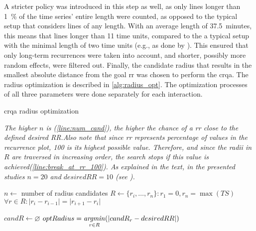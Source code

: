 A stricter policy was introduced in this step as well, as only lines longer than \SI{1}{\percent} of the time series' entire length were counted, as opposed to the typical setup that considers lines of any length.
With an average length of \SI{37.5}{minutes}, this means that lines longer than 11 time units, compared to the a typical setup with the minimal length of two time units (e.g., as done by \citet{Borrie2019syncing}).
This ensured that only long-term recurrences were taken into account, and shorter, possibly more random effects, were filtered out.
Finally, the candidate radius that results in the smallest absolute distance from the goal \ac{rr} was chosen to perform the \ac{crqa}.
The radius optimization is described in \cref{alg:radius_opt}.
The optimization processes of all three parameters were done separately for each interaction.
%
\begin{algorithm}[t]
	\caption{\acs{crqa} radius optimization}
	\label{alg:radius_opt}
	\algorithmcaption
		{\emph{The higher $n$ is (\cref{line:num_cand}), the higher the chance of a \ac{rr} close to the defined \emph{desired RR}.Also note that since \ac{rr} represents percentage of values in the recurrence plot, 100 is its highest possible value.			Therefore, and since the radii in $R$ are traversed in increasing order, the search stops if this value is achieved(\cref{line:break_at_rr_100}). As explained in the text, in the presented studies $n = 20$ and $desiredRR = 10$ (see \citet{Coco2014crqa-r}).}}
	\DontPrintSemicolon
	
	
	$n \gets$ number of radius candidates \label{line:num_cand}\;
	$R \gets \{r_i, \ldots, r_n\} : r_1 = 0, r_n = \max(TS)$\;
	$\forall r \in R : \lvert r_i - r_{i-1} \rvert = \lvert r_{i+1} - r_i \rvert$ 
	
	$candR \gets \varnothing$\;
	$optRadius = \displaystyle\operatorname*{\mathit{argmin}}_{r \in R}(\lvert candR_r - desiredRR \rvert)$\;
\end{algorithm}
